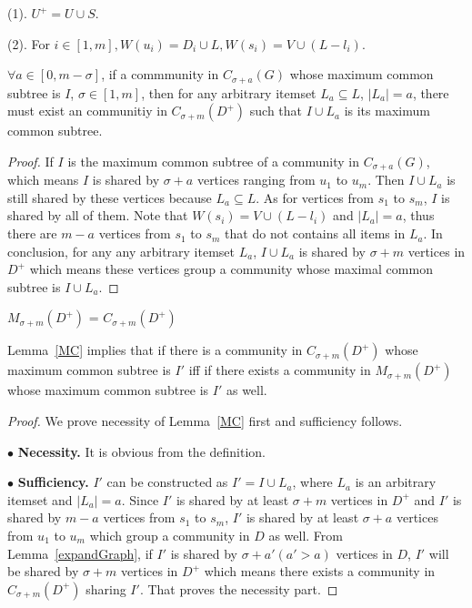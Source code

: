 (1). $U^+=U \cup S$. 

(2). For $i\in [1,m], W(u_i)=D_i \cup L, W(s_i)=V \cup (L-{l_i})$. 

\begin{lemma}
\label{expandGraph}
$\forall a \in [0,m-\sigma]$, if a commmunity in $C_{\sigma +a}(G)$ whose maximum common subtree is $I$, $\sigma \in [1,m]$, then for any arbitrary itemset $L_a \subseteq L$, $|L_a|=a$, there must exist an communitiy in $C_{\sigma +m}(D^+)$ such that $I \cup L_a$ is its maximum common subtree. 
\end{lemma}  

\begin{proof}
If $I$ is the maximum common subtree of a community in $C_{\sigma +a}(G)$, which means $I$ is shared by $\sigma +a$ vertices ranging from $u_1$ to $u_m$. Then $I \cup L_a$ is still shared by these vertices because $L_a \subseteq L$. As for vertices from $s_1$ to $s_m$, $I$ is shared by all of them. Note that $W(s_i)=V \cup (L-{l_i})$ and $|L_a|=a$, thus there are $m-a$ vertices from $s_1$ to $s_m$ that do not contains all items in $L_a$. In conclusion, for any any arbitrary itemset $L_a$, $I \cup L_a$ is shared by $\sigma +m$ vertices in $D^+$ which means these vertices group a community whose maximal common subtree is $I \cup L_a$.
\end{proof}

\begin{lemma}
\label{MC}
$M_{\sigma +m}(D^+)$ = $C_{\sigma +m}(D^+)$
\end{lemma}

Lemma~\ref{MC} implies that if there is a community in $C_{\sigma +m}(D^+)$ whose maximum common subtree is $I'$ iff if there exists a community in $M_{\sigma +m}(D^+)$ whose maximum common subtree is $I'$ as well. 

\begin{proof}
We prove necessity of Lemma~\ref{MC} first and sufficiency follows.

$\bullet$ \textbf{Necessity.} It is obvious from the definition.

$\bullet$ \textbf{Sufficiency.} $I'$ can be constructed as $I'= I \cup L_a$, where $L_a$ is an arbitrary itemset and $|L_a|=a$. Since $I'$ is shared by at least $\sigma +m$ vertices in $D^+$ and $I'$ is shared by $m-a$ vertices from $s_1$ to $s_m$, $I'$ is shared by at least $\sigma+a$ vertices from $u_1$ to $u_m$ which group a community in $D$ as well. From Lemma~\ref{expandGraph}, if $I'$ is shared by $\sigma+a' (a'>a)$ vertices in $D$, $I'$ will be shared by $\sigma+m$ vertices in $D^+$ which means there exists a community in $C_{\sigma +m}(D^+)$ sharing $I'$. That proves the necessity part. 
\end{proof}

